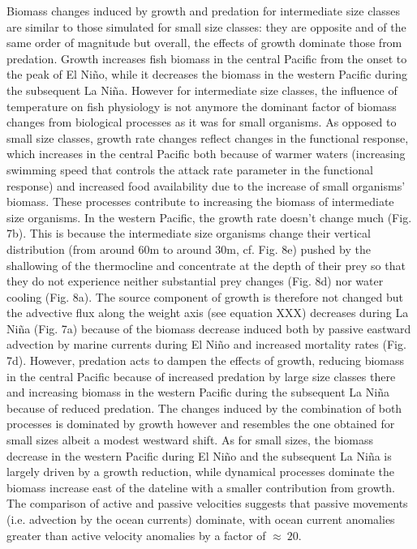 Biomass changes induced by growth and predation for intermediate size classes are similar to those simulated for small size classes: they are opposite and of the same order of magnitude but overall, the effects of growth dominate those from predation. Growth increases fish biomass in the central Pacific from the onset to the peak of El Niño, while it decreases the biomass in the western Pacific during the subsequent La Niña. However for intermediate size classes, the influence of temperature on fish physiology is not anymore the dominant factor of biomass changes from biological processes as it was for small organisms. As opposed to small size classes, growth rate changes reflect changes in the functional response, which increases in the central Pacific both because of warmer waters (increasing swimming speed that controls the attack rate parameter in the functional response) and increased food availability due to the increase of small organisms' biomass. These processes contribute to increasing the biomass of intermediate size organisms. In the western Pacific, the growth rate doesn't change much (Fig. 7b). This is because the intermediate size organisms change their vertical distribution (from around 60m to around 30m, cf. Fig. 8e) pushed by the shallowing of the thermocline and concentrate at the depth of their prey so that they do not experience neither substantial prey changes (Fig. 8d) nor water cooling (Fig. 8a). The source component of growth is therefore not changed but the advective flux along the weight axis (see equation XXX) decreases during La Niña (Fig. 7a) because of the biomass decrease induced both by passive eastward advection by marine currents during El Niño and increased mortality rates (Fig. 7d). However, predation acts to dampen the effects of growth, reducing biomass in the central Pacific because of increased predation by large size classes there and increasing biomass in the western Pacific during the subsequent La Niña because of reduced predation. The changes induced by the combination of both processes is dominated by growth however and resembles the one obtained for small sizes albeit a modest westward shift. As for small sizes, the biomass decrease in the western Pacific during El Niño and the subsequent La Niña is largely driven by a growth reduction, while dynamical processes dominate the biomass increase east of the dateline with a smaller contribution from growth.  The comparison of active and passive velocities suggests that passive movements (i.e. advection by the ocean currents) dominate, with ocean current anomalies greater than active velocity anomalies by a factor of $\approx\ 20$.

